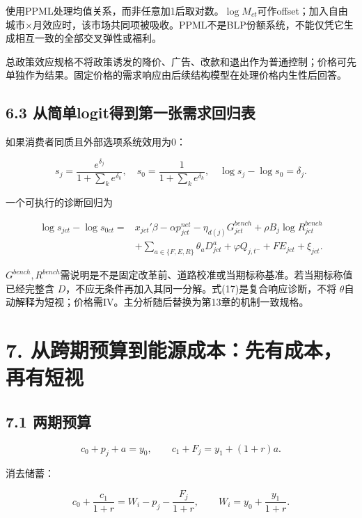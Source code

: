 \documentclass[
  11pt,
]{article}
\begin{document}
使用PPML处理均值关系，而非任意加1后取对数。\(\log M_{ct}\)可作offset；加入自由城市×月效应时，该市场共同项被吸收。PPML不是BLP份额系统，不能仅凭它生成相互一致的全部交叉弹性或福利。

总政策效应规格不将政策诱发的降价、广告、改款和退出作为普通控制；价格可先单独作为结果。固定价格的需求响应由后续结构模型在处理价格内生性后回答。

\subsection{6.3
从简单logit得到第一张需求回归表}\label{ux4eceux7b80ux5355logitux5f97ux5230ux7b2cux4e00ux5f20ux9700ux6c42ux56deux5f52ux8868}

如果消费者同质且外部选项系统效用为0：

\[
s_j=\frac{e^{\delta_j}}{1+\sum_k e^{\delta_k}},\quad
s_0=\frac{1}{1+\sum_k e^{\delta_k}},\quad
\log s_j-\log s_0=\delta_j. \tag{16}
\]

一个可执行的诊断回归为

\[
\begin{aligned}
\log s_{jct}-\log s_{0ct}
={}&x_{jct}'\beta-\alpha p_{jct}^{net}
-\eta_{d(j)}G_{jct}^{bench}
+\rho B_j\log R_{jct}^{bench}\\
&+\sum_{a\in\{F,E,R\}}\theta_aD_{jct}^{a}
+\varphi Q_{j,t^-}+FE_{jct}+\xi_{jct}.
\end{aligned} \tag{17}
\]

\(G^{bench},R^{bench}\)需说明是不是固定改革前、道路校准或当期标称基准。若当期标称值已经完整含
\(D\)，不应无条件再加入其同一分解。式(17)是复合响应诊断，不将
\(\theta\)自动解释为短视；价格需IV。主分析随后替换为第13章的机制一致规格。

\section{7.
从跨期预算到能源成本：先有成本，再有短视}\label{ux4eceux8de8ux671fux9884ux7b97ux5230ux80fdux6e90ux6210ux672cux5148ux6709ux6210ux672cux518dux6709ux77edux89c6}

\subsection{7.1 两期预算}\label{ux4e24ux671fux9884ux7b97}

\[
c_0+p_j+a=y_0,\qquad
c_1+F_j=y_1+(1+r)a.
\]

消去储蓄：

\[
c_0+\frac{c_1}{1+r}
=W_i-p_j-\frac{F_j}{1+r},
\qquad W_i=y_0+\frac{y_1}{1+r}. \tag{18}
\]
\end{document}
